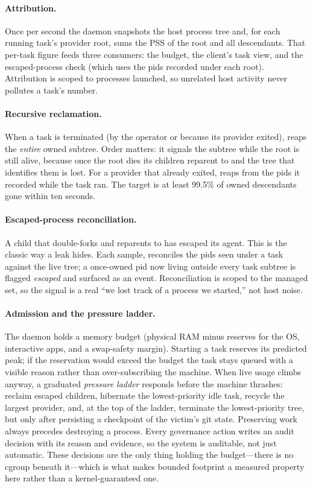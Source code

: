 \paragraph{Attribution.} Once per second the daemon snapshots the host process tree and, for each
running task's provider root, sums the PSS of the root and all descendants. That per-task figure
feeds three consumers: the budget, the client's task view, and the escaped-process check (which uses
the pids recorded under each root). Attribution is scoped to processes \sys{} launched, so unrelated
host activity never pollutes a task's number.

\paragraph{Recursive reclamation.} When a task is terminated (by the operator or because its provider
exited), \sys{} reaps the \emph{entire} owned subtree. Order matters: it signals the subtree while the
root is still alive, because once the root dies its children reparent to  and the tree that
identifies them is lost. For a provider that already exited, \sys{} reaps from the pids it recorded
while the task ran. The target is at least 99.5\% of owned descendants gone within ten seconds.

\paragraph{Escaped-process reconciliation.} A child that double-forks and reparents to 
has escaped its agent. This is the classic way a leak hides. Each sample, \sys{} reconciles the pids
seen under a task against the live tree; a once-owned pid now living outside every task subtree is
flagged \emph{escaped} and surfaced as an event. Reconciliation is scoped to the managed set, so the signal
is a real ``we lost track of a process we started,'' not host noise.

\paragraph{Admission and the pressure ladder.} The daemon holds a memory budget (physical RAM minus
reserves for the OS, interactive apps, and a swap-safety margin). Starting a task reserves its
predicted peak; if the reservation would exceed the budget the task stays queued with a visible
reason rather than over-subscribing the machine. When live usage climbs anyway, a graduated
\emph{pressure ladder} responds before the machine thrashes: reclaim escaped children, hibernate the
lowest-priority idle task, recycle the largest provider, and, at the top of the ladder, terminate the
lowest-priority tree, but only after persisting a checkpoint of the victim's git state. Preserving
work always precedes destroying a process. Every governance action writes an audit decision with its
reason and evidence, so the system is auditable, not just automatic. These decisions are the only
thing holding the budget---there is no cgroup beneath it---which is what makes bounded footprint a
measured property here rather than a kernel-guaranteed one.

